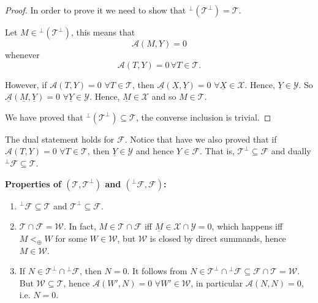 \begin{proof}
  In order to prove it we need to show that $^\perp(\mathcal{T}^\perp)
= \mathcal{T}$.

  Let $M\in {^\perp(\mathcal{T}^\perp)}$, this means that
  \begin{equation}
    \mathcal{A}(M,Y) = 0
  \end{equation}
  whenever
  \begin{equation}
    \mathcal{A}(T,Y) = 0\,\forall T\in\mathcal{T}.
  \end{equation}

  However, if $\mathcal{A}(T,Y)=0$ $\forall T\in\mathcal{T}$, then
$\underline{\mathcal{A}}(\underline{X},\underline{Y})=0$ $\forall
\underline{X}\in\mathcal{X}$. Hence, $\underline{Y}\in\mathcal{Y}$.
  So $\underline{\mathcal{A}}(\underline{M},\underline{Y})=0$ $\forall
\underline{Y}\in\mathcal{Y}$. Hence, $\underline{M}\in\mathcal{X}$ and
so $M\in\mathcal{T}$.

  We have proved that $^\perp(\mathcal{T}^\perp) \subseteq
\mathcal{T}$, the converse inclusion is trivial.
\end{proof}

\begin{rmk}
  The dual statement holds for $\mathcal{F}$. Notice that have we also
proved that if $\mathcal{A}(T,Y)=0$ $\forall T\in\mathcal{T}$, then
$\underline{Y}\in\mathcal{Y}$ and hence $Y\in\mathcal{F}$. That is,
$\mathcal{T}^\perp \subseteq \mathcal{F}$ and dually
$^\perp\mathcal{F}\subseteq \mathcal{T}$.
\end{rmk}

\sepline

\bf Properties of $(\mathcal{T},\mathcal{T}^\perp)$ and
$(^\perp\mathcal{F},\mathcal{F})$: \rm
\begin{enumerate}
  \item $^\perp\mathcal{F}\subseteq\mathcal{T}$ and
$\mathcal{T}^\perp\subseteq \mathcal{F}$.
  \item $\mathcal{T}\cap\mathcal{F} = \mathcal{W}$.
  In fact, $M\in\mathcal{T}\cap\mathcal{F}$ iff
$\underline{M}\in\mathcal{X}\cap\mathcal{Y}=0$, which happens iff
$M<_\oplus W$ for some $W\in\mathcal{W}$,
  but $\mathcal{W}$ is closed by direct summands, hence $M\in\mathcal{W}$.
  \item If $N\in\mathcal{T}^\perp \cap{^\perp\mathcal{F}}$, then $N=0$.
It follows from $N\in\mathcal{T}^\perp
\cap{^\perp\mathcal{F}}\subseteq\mathcal{F}\cap\mathcal{T}=\mathcal{W}$.
But $\mathcal{W}\subseteq\mathcal{T}$, hence $\mathcal{A}(W',N)=0$
$\forall W'\in\mathcal{W}$,
  in particular $\mathcal{A}(N,N)=0$, i.e. $N=0$.
\end{enumerate}

